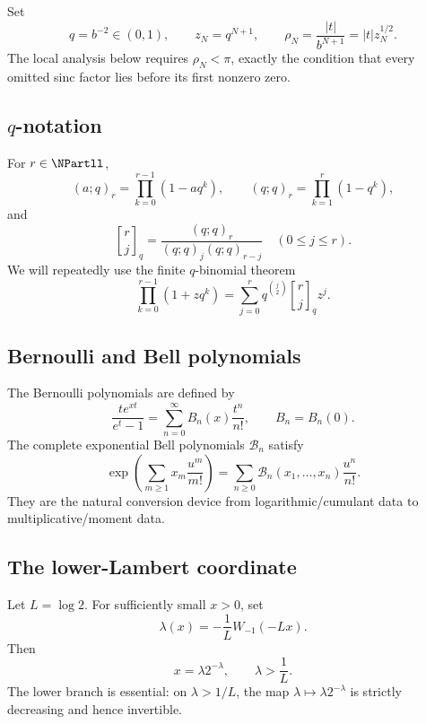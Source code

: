 \documentclass[11pt]{article}
\numberwithin{equation}{section}
\theoremstyle{definition}
\theoremstyle{remark}
\newcommand{\qbinom}[3]{\genfrac{[}{]}{0pt}{}{#1}{#2}_{#3}}
\begin{document}
Set
\begin{equation}
q=b^{-2}\in(0,1),\qquad z_N=q^{N+1},\qquad
\rho_N=\frac{|t|}{b^{N+1}}=|t|z_N^{1/2}.
\label{p8:eq:q-z-rho}
\end{equation}
The local analysis below requires $\rho_N<\pi$, exactly the condition that every omitted sinc factor lies before its first nonzero zero.

\subsection{\texorpdfstring{$q$}{q}-notation}

For $r\in\NPartll$,
\[
(a;q)_r=\prod_{k=0}^{r-1}(1-aq^k),\qquad
(q;q)_r=\prod_{k=1}^{r}(1-q^k),
\]
and
\[
\qbinom{r}{j}{q}=\frac{(q;q)_r}{(q;q)_j(q;q)_{r-j}}
\quad(0\le j\le r).
\]
We will repeatedly use the finite $q$-binomial theorem
\begin{equation}
\prod_{k=0}^{r-1}(1+zq^k)
=\sum_{j=0}^{r}q^{\binom{j}{2}}\qbinom{r}{j}{q} z^j.
\label{p8:eq:q-binomial}
\end{equation}

\subsection{Bernoulli and Bell polynomials}

The Bernoulli polynomials are defined by
\begin{equation}
\frac{te^{xt}}{e^t-1}=\sum_{n=0}^{\infty}B_n(x)\frac{t^n}{n!},
\qquad B_n=B_n(0).
\label{p8:eq:bernoulli-gen}
\end{equation}
The complete exponential Bell polynomials $\mathcal B_n$ satisfy
\begin{equation}
\exp\!\left(\sum_{m\ge1}x_m\frac{u^m}{m!}\right)
=\sum_{n\ge0}\mathcal B_n(x_1,\ldots,x_n)\frac{u^n}{n!}.
\label{p8:eq:bell-gen}
\end{equation}
They are the natural conversion device from logarithmic/cumulant data to multiplicative/moment data.

\subsection{The lower-Lambert coordinate}

Let $L=\log 2$. For sufficiently small $x>0$, set
\begin{equation}
\lambda(x)=-\frac{1}{L}W_{-1}(-Lx).
\label{p8:eq:lambda-def}
\end{equation}
Then
\begin{equation}
x=\lambda 2^{-\lambda},\qquad \lambda>\frac1L.
\label{p8:eq:lambda-inverse}
\end{equation}
The lower branch is essential: on $\lambda>1/L$, the map $\lambda\mapsto\lambda2^{-\lambda}$ is strictly decreasing and hence invertible.
\end{document}
